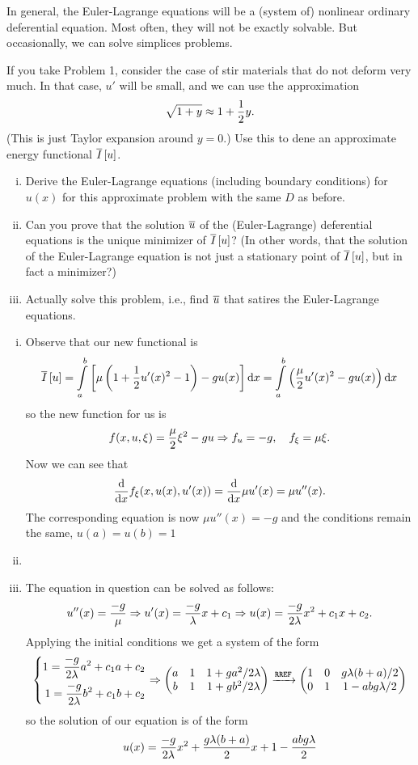 \documentclass[12pt]{memoir}
\begin{document}
\begin{Ej}
    In general, the Euler-Lagrange equations will be a (system
    of) nonlinear ordinary deferential equation. Most often, they will not be exactly solvable. But occasionally,
    we can solve simplices problems.\par
    If you take Problem 1, consider the case of stir materials that do not deform very much. In that case, $u'$
    will be small, and we can use the approximation
    $$\sqrt{1+y}\approx 1+\half y.$$
    (This is just Taylor expansion around $y = 0$.) Use this to dene an approximate energy functional $\overline I\left\lbrack u\right\rbrack$.
    \begin{enumerate}[i)]
        \item Derive the Euler-Lagrange equations (including boundary conditions) for $u(x)$ for this approximate
        problem with the same $D$ as before.
        \item Can you prove that the solution $\overline u$ of the (Euler-Lagrange) deferential equations is the unique minimizer
        of $\overline I\left\lbrack u\right\rbrack$? (In other words, that the solution of the Euler-Lagrange equation is not just a stationary
        point of $\overline I\left\lbrack u\right\rbrack$, but in fact a minimizer?)
        \item Actually solve this problem, i.e., find $\overline u$ that satires the Euler-Lagrange equations.
    \end{enumerate}
\end{Ej}


\begin{ptcbr}
    \begin{enumerate}[i)]
        \item Observe that our new functional is 
        $$\ov I\bonj{u}=\int\limits_a^b \bonj{\mu\left(1+\half u'(x)^2-1\right)-gu(x)}\dd x=\int\limits_a^b \left(\frac{\mu}{2}u'(x)^2-gu(x)\right)\dd x$$
        so the new function for us is 
        $$f(x,u,\xi)=\frac{\mu}{2}\xi^2-gu\Rightarrow f_u=-g,\quad f_\xi=\mu\xi.$$
        Now we can see that
        $$\dv{x}f_{\xi}(x,u(x),u'(x))=\dv{x}\mu u'(x)=\mu u''(x).$$
        The corresponding equation is now $\mu u''(x)=-g$ and the conditions remain the same, $u(a)=u(b)=1$
        \item {}
        \item The equation in question can be solved as follows:
        $$u''(x)=\frac{-g}{\mu}\Rightarrow u'(x)=\frac{-g}{\lambda}x+c_1\Rightarrow u(x)=\frac{-g}{2\lambda}x^2+c_1x+c_2.$$
        Applying the initial conditions we get a system of the form 
        $$
        \left\lbrace
        \begin{aligned}
            1=\frac{-g}{2\lambda}a^2+c_1a+c_2\\
            1=\frac{-g}{2\lambda}b^2+c_1b+c_2
        \end{aligned}
        \right.\Rightarrow
        \begin{pmatrix} a & 1 & 1+ga^2/2\lambda\\ b & 1 & 1+gb^2/2\lambda \end{pmatrix}\xrightarrow[]{\texttt{RREF}}\begin{pmatrix} 1 & 0 & g\lambda(b+a)/2\\ 0 & 1 & 1-abg\lambda/2 \end{pmatrix}
        $$
        so the solution of our equation is of the form 
        $$u(x)=\frac{-g}{2\lambda}x^2+\frac{g\lambda(b+a)}{2}x+1-\frac{abg\lambda}{2}$$
    \end{enumerate}
\end{ptcbr}
\end{document}

